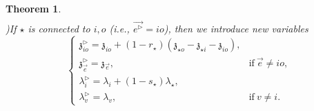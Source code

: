 \documentclass[11pt]{amsart}
\newtheorem{thm}{Theorem}[section]
\theoremstyle{definition}
\theoremstyle{remark}
\numberwithin{equation}{section}
\begin{document}
\begin{thm}
\begin{align*}
\end{align*}
)If $\star$ is connected to $i,o$ (i.e., $\vec{e^\triangleright}=io$), then we introduce new variables
  $$
  \begin{cases}
    \mathfrak{z}^\triangleright_{io}=\mathfrak{z}_{io}+(1-r_{\star})(\mathfrak{z}_{\star o}-\mathfrak{z}_{\star i}-\mathfrak{z}_{io}), & \\
   \mathfrak{z}^\triangleright_{\vec{e}}=\mathfrak{z}_{\vec{e}} , & \mbox{if}\ \vec{e}\neq io,\\
   \lambda^\triangleright_i= \lambda_i+(1-s_{\star})\lambda_{\star},&\\
   \lambda^\triangleright_v=\lambda_v,& \mbox{if}\ v\neq i.
  \end{cases}
  $$
 \iffalse
  $$
\mu_{V(\Gamma^{\star})}\left(W_{\Gamma^{\star}}(\mathfrak{z}_{\vec{e}})\right)=\int_{([0,1]\times[0,1])^{|\mathbf{H}_{\Gamma}(o,e)|+1}}e^{\mathbf{W}^{r,s}_{\Gamma,\mathbf{H}_{\Gamma}(o,e)}}\cdot \mathbf{G}^{r,s}_{\Gamma^{\star},\mathbf{H}_{\Gamma^{\star}}(o,e)}\cdot (dr_{\star}\wedge ds_{\star})\bigwedge_{k=1,\dots,|\mathbf{H}_{\Gamma^{\star}}(o,e)|} (dr_k\wedge ds_k)
$$
\fi
  \iffalse
\begin{align*}
& \mu_{V(\Gamma)}\left(W^{r,s}_{\Gamma^{\star}}(\mathfrak{z}_{\vec{e}})\right)  = \int_{([0,1]\times[0,1])^{|\mathbf{H}_{\Gamma}(o,e)|+1}} e^{\mathbf{W}^{r,s}_{\Gamma,\mathbf{H}_{\Gamma}(o,e)}+(1-r_{\star})\left(\partial_{\mathfrak{z}_{ij}}\mathbf{W}^{r,s}_{\Gamma,\mathbf{H}_{\Gamma}(o,e)}|\mathfrak{z}_{\star j}-\mathfrak{z}_{\star i}-\mathfrak{z}_{ij}\right)-\left((1-s_{\star})\mathfrak{z}_{\star i}+s_{\star}\mathfrak{z}_{\star j}|\lambda_{\star}\right)} \\
   & \cdot e^{\left(((1-s_{\star})\partial_{\lambda_i}+s_{\star}\partial_{\lambda_j})(\mathbf{W}^{r,s}_{\Gamma,\mathbf{H}_{\Gamma}(o,e)}+(1-r_{\star})(\partial_{\mathfrak{z}_{ij}}\mathbf{W}^{r,s}_{\Gamma,\mathbf{H}_{\Gamma}(o,e)}|\mathfrak{z}_{\star j}-\mathfrak{z}_{\star i}-\mathfrak{z}_{ij}))|\lambda_{\star}\right)}\cdot \left(\partial_{\mathfrak{z}_{ij}}\mathbf{W}^{r,s}_{\Gamma,\mathbf{H}_{\Gamma}(o,e)}\wedge\lambda_{\star}\right)\cdot r_{\star}\\
   &\cdot  \mathbf{G}^{r,s}_{\Gamma,\mathbf{H}_{\Gamma}(o,e)}(\lambda_1,\dots,\lambda_i+(1-s_{\star})\lambda_{\star},\dots,\lambda_j+s_{\star}\lambda_{\star},\dots,\lambda_{n})\cdot (dr_{\star}\wedge ds_{\star})\cdot \bigwedge_{k=1,\dots,|\mathbf{H}_{\Gamma}(o,e)|} (dr_k\wedge ds_k)
\end{align*}
\fi
\begin{align*}

\end{align*}
\end{thm}
\end{document}
